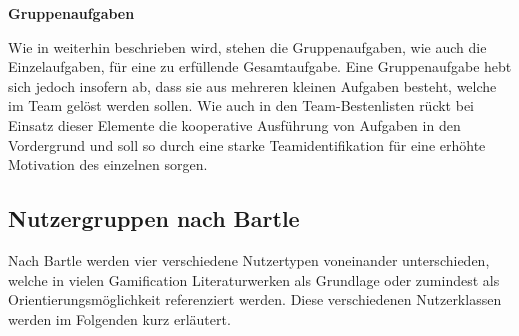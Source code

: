 \documentclass[bibliography=totoc,listof=totoc,BCOR=5mm,DIV=12,oneside]{scrbook}
\begin{document}
\par \bigskip \textbf{Gruppenaufgaben}
\par Wie in \citep[Kapitel 6.1.1 Tasks]{pflanzl2018gamification} weiterhin beschrieben wird, stehen die Gruppenaufgaben, wie auch die Einzelaufgaben, für eine zu erfüllende Gesamtaufgabe. Eine Gruppenaufgabe hebt sich jedoch insofern ab, dass sie aus mehreren kleinen Aufgaben besteht, welche im Team gelöst werden sollen. Wie auch in den Team-Bestenlisten rückt bei Einsatz dieser Elemente die kooperative Ausführung von Aufgaben in den Vordergrund und soll so durch eine starke Teamidentifikation für eine erhöhte Motivation des einzelnen sorgen.

\subsection{Nutzergruppen nach Bartle} \label{sub:nutzergruppenBartle}
\par Nach Bartle \citep{bartle1996hearts} werden vier verschiedene Nutzertypen voneinander unterschieden, welche in vielen Gamification Literaturwerken als Grundlage oder zumindest als Orientierungsmöglichkeit referenziert werden. Diese verschiedenen Nutzerklassen werden im Folgenden kurz erläutert.
\end{document}
